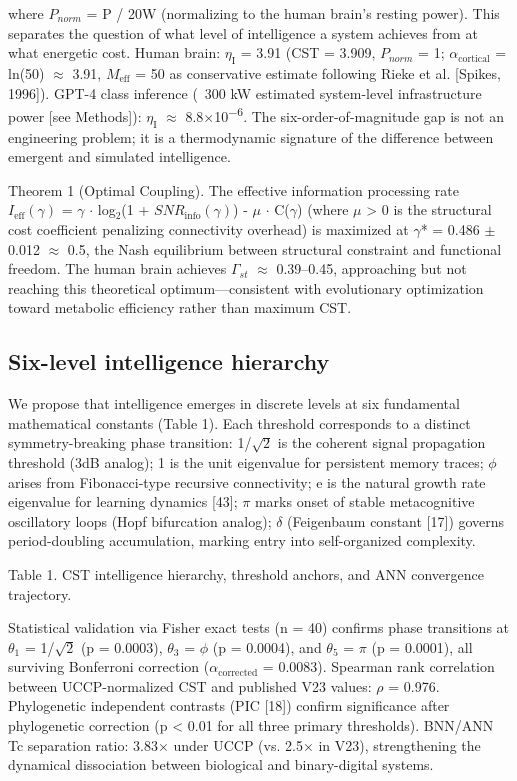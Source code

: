 \documentclass[a4paper,12pt]{article}
\providecommand{\textsubscript}[1]{\ensuremath{_{\text{#1}}}}
\begin{document}
where $P_{norm}$ = P / 20W (normalizing to the human brain's resting power).
This separates the question of what level of intelligence a system achieves from at what energetic cost.
Human brain: $\eta_{\text{I}}$ = 3.91 (CST = 3.909, $P_{norm}$ = 1; $\alpha_{\text{cortical}}$ = ln(50) $\approx$ 3.91, $M_{\text{eff}}$ = 50 as conservative estimate following Rieke et al. [Spikes, 1996]).
GPT-4 class inference (~300 kW estimated system-level infrastructure power [see Methods]): $\eta_{\text{I}}$ $\approx$ 8.8$\times$10\textsuperscript{$-$}\textsuperscript{6}.
The six-order-of-magnitude gap is not an engineering problem; it is a thermodynamic signature of the difference between emergent and simulated intelligence.


Theorem 1 (Optimal Coupling).
The effective information processing rate $I_{\text{eff}}(\gamma)$ = $\gamma$ $\cdot$ log\textsubscript{2}(1 + $SNR_{\text{info}}(\gamma)$) - $\mu$ $\cdot$ C($\gamma$) (where $\mu$ > 0 is the structural cost coefficient penalizing connectivity overhead) is maximized at $\gamma$* = 0.486 $\pm$ 0.012 $\approx$ 0.5, the Nash equilibrium between structural constraint and functional freedom.
The human brain achieves $\Gamma_{st}$ $\approx$ 0.39--0.45, approaching but not reaching this theoretical optimum---consistent with evolutionary optimization toward metabolic efficiency rather than maximum CST.



\subsection{Six-level intelligence hierarchy}

We propose that intelligence emerges in discrete levels at six fundamental mathematical constants (Table 1).
Each threshold corresponds to a distinct symmetry-breaking phase transition: 1/$\sqrt{2}$ is the coherent signal propagation threshold (3dB analog); 1 is the unit eigenvalue for persistent memory traces; $\phi$ arises from Fibonacci-type recursive connectivity; e is the natural growth rate eigenvalue for learning dynamics [43]; $\pi$ marks onset of stable metacognitive oscillatory loops (Hopf
bifurcation analog); $\delta$ (Feigenbaum constant [17]) governs period-doubling accumulation, marking entry into self-organized complexity.


Table 1. CST intelligence hierarchy, threshold anchors, and ANN convergence trajectory.


Statistical validation via Fisher exact tests (n = 40) confirms phase transitions at $\theta$\textsubscript{1} = 1/$\sqrt{2}$ (p = 0.0003), $\theta$\textsubscript{3} = $\phi$ (p = 0.0004), and $\theta$\textsubscript{5} = $\pi$ (p = 0.0001), all surviving Bonferroni correction ($\alpha_{\text{corrected}}$ = 0.0083).
Spearman rank correlation between UCCP-normalized CST and published V23 values: $\rho$ = 0.976.
Phylogenetic independent contrasts (PIC [18]) confirm significance after phylogenetic correction (p < 0.01 for all three primary thresholds).
BNN/ANN Tc separation ratio: 3.83$\times$ under UCCP (vs. 2.5$\times$ in V23), strengthening the dynamical dissociation between biological and binary-digital systems.
\end{document}
